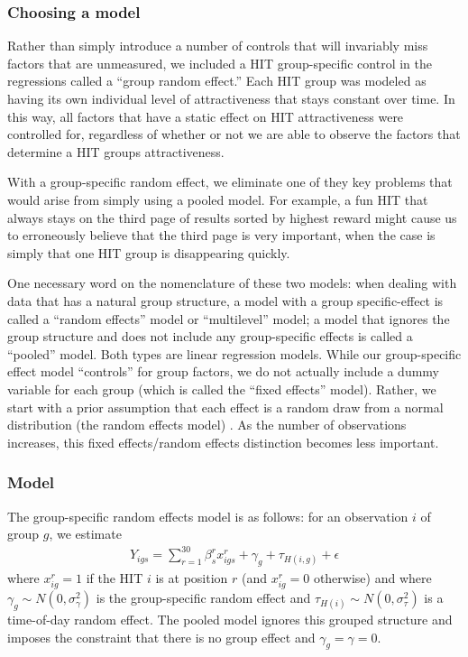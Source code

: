 \documentclass{sig-alternate}
\begin{document}
\subsubsection{Choosing a model}
Rather than simply introduce a number of controls that will invariably
miss factors that are unmeasured, we included a HIT group-specific
control in the regressions called a ``group random effect.''  Each HIT
group was modeled as having its own individual level of attractiveness
that stays constant over time.  In this way, all factors that have a
static effect on HIT attractiveness were controlled for, regardless of
whether or not we are able to observe the factors that determine a HIT
groups attractiveness.

With a group-specific random effect, we eliminate one of they key
problems that would arise from simply using a pooled model.  For
example, a fun HIT that always stays on the third page of results
sorted by highest reward might cause us to erroneously believe that
the third page is very important, when the case is simply that one HIT
group is disappearing quickly.  

One necessary word on the nomenclature of these two models: when
dealing with data that has a natural group structure, a model with a
group specific-effect is called a ``random effects'' model or
``multilevel'' model; a model that ignores the group structure and
does not include any group-specific effects is called a ``pooled''
model.  Both types are linear regression models.  While our
group-specific effect model ``controls'' for group factors, we do not
actually include a dummy variable for each group (which is called the
``fixed effects'' model).  Rather, we start with a prior assumption
that each effect is a random draw from a normal distribution (the
random effects model) \cite{gelman2007data}.  As the number of
observations increases, this fixed effects/random effects distinction
becomes less important.

\subsubsection{Model}
The group-specific random effects model is as follows: for an
observation $i$ of group $g$, we estimate 
\begin{align} \label{eq:groups}
Y_{igs} = \sum_{r=1}^{30}\beta^r_s x^r_{igs} + \gamma_g + \tau_{H(i,g)} + \epsilon
\end{align} 
where $x^r_{ig}=1$ if the HIT $i$ is at position $r$ (and
$x^r_{ig}=0$ otherwise) and where $\gamma_g \sim
N(0,\sigma_\gamma^2)$ is the group-specific random effect and
$\tau_{H(i)} \sim N(0,\sigma^2_\tau)$ is a time-of-day random
effect.  The pooled model ignores this grouped structure and
imposes the constraint that there is no group effect and $\gamma_g =
\gamma = 0$.
\end{document}
